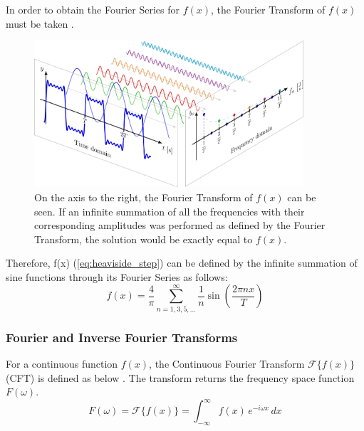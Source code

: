 \noindent
In order to obtain the Fourier Series for \(f(x)\), the Fourier Transform of \(f(x)\) must be taken \citep{Tutorialspoint_2022}.

\begin{figure}[H]
    \centering
    \includegraphics[width=100mm,height=\textheight,keepaspectratio]{images/step_function_fourier_series.png}
    \caption{On the axis to the right, the Fourier Transform of \(f(x)\) can be seen. If an infinite summation of all the frequencies with their corresponding amplitudes was performed as defined by the Fourier Transform, the solution would be exactly equal to \(f(x)\).}
    \label{fig:decomposed_step_function}
\end{figure}

\noindent
Therefore, f(x) (\cref{eq:heaviside_step}) can be defined by the infinite summation of sine functions through its Fourier Series as follows: 
\begin{equation}
    f(x)=\frac{4}{\pi}\sum_{n=1,3,5,...}^{\infty} \frac{1}{n} \sin \left( \frac{2 \pi n x}{T}
 \right)
\end{equation}

\subsubsection{Fourier and Inverse Fourier Transforms}
\begin{definition}
    For a continuous function $f(x)$, the Continuous Fourier Transform $\mathcal{F}\{ f(x) \}$ (CFT) is defined as below \citep{grafakos2008classical}. The transform returns the frequency space function $F(\omega)$.
    \begin{equation} \label{eq:fourier_transform}
        F(\omega) = \mathcal{F}\{ f(x) \} = \int_{-\infty}^{\infty} f(x)  \, e^{-i \omega x} \,dx
    \end{equation}
\end{definition}


